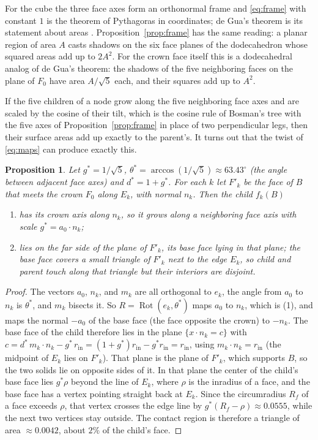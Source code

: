 \documentclass[12pt]{article}
\theoremstyle{plain}
\newtheorem{proposition}[theorem]{Proposition}
\theoremstyle{remark}
\newcommand{\Rot}{\operatorname{Rot}}
\begin{document}
For the cube the three face axes form an orthonormal frame and
\eqref{eq:frame} with constant $1$ is the theorem of Pythagoras in coordinates;
de Gua's theorem is its statement about areas \cite{ConantBeyer1974}.
Proposition~\ref{prop:frame} has the same reading: a planar region of area $A$
casts shadows on the six face planes of the dodecahedron whose squared areas
add up to $2A^2$.  For the crown face itself this is a dodecahedral analog
of de Gua's theorem: the shadows of the five neighboring faces on the plane
of $F_0$ have area $A/\sqrt5$ each, and their squares add up to $A^2$.

If the five children of a node grow along the five neighboring face axes and
are scaled by the cosine of their tilt, which is the cosine rule of Bosman's
tree with the five axes of Proposition~\ref{prop:frame} in place of two
perpendicular legs, then their surface areas add up exactly to the parent's.
It turns out that the twist of \eqref{eq:maps} can produce exactly this.

\begin{proposition}\label{prop:kiss}
Let $g^*=1/\sqrt5$, $\theta^*=\arccos(1/\sqrt5)\approx63.43^\circ$ (the angle
between adjacent face axes) and $d^*=1+g^*$.  For each $k$ let $F'_k$ be the
face of $B$ that meets the crown $F_0$ along $E_k$, with normal $n_k$.  Then
the child $f_k(B)$
\begin{enumerate}
\item has its crown axis along $n_k$, so it grows along a neighboring face
axis with scale $g^*=a_0\cdot n_k$;
\item lies on the far side of the plane of $F'_k$, its base face lying in that
plane; the base face covers a small triangle of $F'_k$ next to the edge $E_k$,
so child and parent touch along that triangle but their interiors are disjoint.
\end{enumerate}
\end{proposition}

\begin{proof}
The vectors $a_0$, $n_k$, and $m_k$ are all orthogonal to $e_k$, the angle from
$a_0$ to $n_k$ is $\theta^*$, and $m_k$ bisects it.  So $R=\Rot(e_k,\theta^*)$
maps $a_0$ to $n_k$, which is (1), and maps the normal $-a_0$ of the base face
(the face opposite the crown) to $-n_k$.  The base face of the child therefore
lies in the plane $\{x\cdot n_k=c\}$ with
$c = d^*\,m_k\cdot n_k - g^*\,r_{\mathrm{in}} = (1+g^*)r_{\mathrm{in}}-g^*r_{\mathrm{in}}=r_{\mathrm{in}}$,
using $m_k\cdot n_k=r_{\mathrm{in}}$ (the midpoint of $E_k$ lies on $F'_k$).
That plane is the plane of $F'_k$, which supports $B$, so the two solids lie on
opposite sides of it.  In that plane the center of the child's base face lies
$g^*\rho$ beyond the line of $E_k$, where $\rho$ is the inradius of a face,
and the base face has a vertex pointing straight back at $E_k$.  Since the
circumradius $R_f$ of a face exceeds $\rho$, that vertex crosses the edge line
by $g^*(R_f-\rho)\approx0.0555$, while the next two vertices stay outside.
The contact region is therefore a triangle of area $\approx0.0042$, about
$2\%$ of the child's face.
\end{proof}
\end{document}
